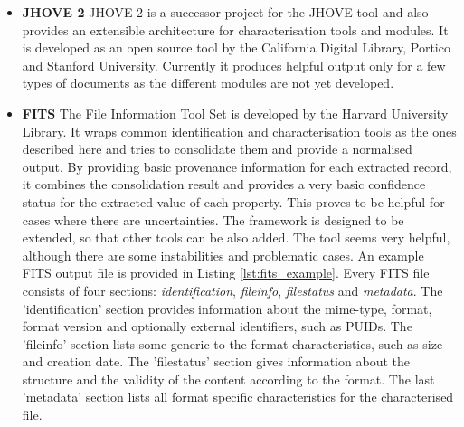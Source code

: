 \begin{itemize}
\item \textbf{JHOVE 2}\newline
JHOVE 2 is a successor project for the JHOVE tool and also provides an extensible architecture for characterisation tools and modules. It is developed as an open source tool by the California Digital Library, Portico and Stanford University. Currently it produces helpful output only for a few types of documents as the different modules are not yet developed.

\item \textbf{FITS} \newline
The File Information Tool Set is developed by the Harvard University Library. It wraps common identification and characterisation tools as the ones described here and tries to consolidate them and provide a normalised output. By providing basic provenance information for each extracted record, it combines the consolidation result and provides a very basic confidence status for the extracted value of each property. This proves to be helpful for cases where there are uncertainties. The framework is designed to be extended, so that other tools can be also added. The tool seems very helpful, although there are some instabilities and problematic cases. An example FITS output file is provided in Listing \ref{lst:fits_example}. Every FITS file consists of four sections: \textit{identification}, \textit{fileinfo}, \textit{filestatus} and \textit{metadata}. The 'identification' section provides information about the mime-type, format, format version and optionally external identifiers, such as PUIDs. The 'fileinfo' section lists some generic to the format characteristics, such as size and creation date. The 'filestatus' section gives information about the structure and the validity of the content according to the format. The last 'metadata' section lists all format specific characteristics for the characterised file.
\end{itemize}

